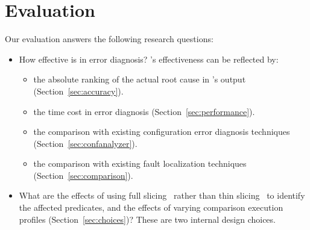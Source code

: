 \section{Evaluation}
\label{sec:evaluation}


Our evaluation answers the following research questions:



\begin{itemize}
\item How effective is \ourtool in error diagnosis? \ourtool's effectiveness can be reflected by:
\begin{itemize}
  \item the absolute ranking of the actual root cause in \ourtool's output (Section~\ref{sec:accuracy}).
  \item the time cost in error diagnosis (Section~\ref{sec:performance}).
  \item the comparison with existing configuration error diagnosis techniques (Section~\ref{sec:confanalyzer}).
  \item the comparison with existing fault localization techniques (Section~\ref{sec:comparison}).
\end{itemize}
\item What are the effects of using full slicing~\cite{Horwitz:1988}
 rather than thin slicing~\cite{Sridharan:2007} to identify
the affected predicates, and the effects of varying comparison execution profiles (Section~\ref{sec:choices})?
These are two internal design choices. %
\end{itemize}


